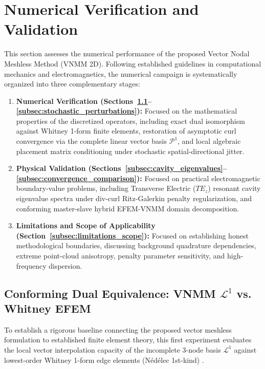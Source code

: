 \documentclass[preprint,12pt]{elsarticle}
\begin{document}
\section{Numerical Verification and Validation}
\label{sec:numerical_results}

This section assesses the numerical performance of the proposed Vector Nodal Meshless Method (VNMM 2D). Following established guidelines in computational mechanics and electromagnetics, the numerical campaign is systematically organized into three complementary stages:
\begin{enumerate}
    \item \textbf{Numerical Verification (Sections~\ref{subsec:conforming_dual_equivalence}--\ref{subsec:stochastic_perturbations}):} Focused on the mathematical properties of the discretized operators, including exact dual isomorphism against Whitney 1-form finite elements, restoration of asymptotic curl convergence via the complete linear vector basis $\mathcal{P}^1$, and local algebraic placement matrix conditioning under stochastic spatial-directional jitter.
    \item \textbf{Physical Validation (Sections~\ref{subsec:cavity_eigenvalues}--\ref{subsec:convergence_comparison}):} Focused on practical electromagnetic boundary-value problems, including Transverse Electric ($TE_z$) resonant cavity eigenvalue spectra under div-curl Ritz-Galerkin penalty regularization, and conforming master-slave hybrid EFEM-VNMM domain decomposition.
    \item \textbf{Limitations and Scope of Applicability (Section~\ref{subsec:limitations_scope}):} Focused on establishing honest methodological boundaries, discussing background quadrature dependencies, extreme point-cloud anisotropy, penalty parameter sensitivity, and high-frequency dispersion.
\end{enumerate}

\subsection{Conforming Dual Equivalence: VNMM $\mathcal{L}^1$ vs. Whitney EFEM}
\label{subsec:conforming_dual_equivalence}

To establish a rigorous baseline connecting the proposed vector meshless formulation to established finite element theory, this first experiment evaluates the local vector interpolation capacity of the incomplete 3-node basis $\mathcal{L}^1$ against lowest-order Whitney 1-form edge elements (N\'ed\'elec 1st-kind) \cite{nedelec1980mixed, monk2003finite}.
\end{document}
